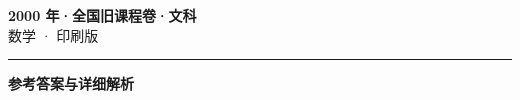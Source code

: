 \documentclass[zihao=5, a4paper]{ctexart}
\begin{document}
\begin{center}
  {\Large\bfseries 2000 年·全国旧课程卷·文科}\\[4pt]
  {\large 数学 · 印刷版}
\end{center}
\medskip
{}

\par\bigskip\hrule\bigskip
{}
\begin{center}{\large\bfseries 参考答案与详细解析}\end{center}
\smallskip

\end{document}
